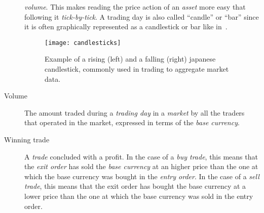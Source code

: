 \begin{description}
		\textit{volume}. This makes reading the price action of an
		\textit{asset} more easy that following it \emph{tick-by-tick}.
		A trading day is also called \enquote{candle} or \enquote{bar}
		since it is often graphically represented as a candlestick or
		bar like in~.
		\begin{figure}[b]
			\centering
			\texttt{[image: candlesticks]}
			\caption{Example of a rising (left) and a falling
				(right) japanese candlestick, commonly used in
				trading to aggregate market
				data.}\label{fig:candlesticks}
		\end{figure}
	\item[Volume] The amount traded during a \textit{trading day} in a
		\textit{market} by all the traders that operated in the market,
		expressed in terms of the \textit{base currency}.
	\item[Winning trade] A \textit{trade} concluded with a profit. In the
		case of a \textit{buy trade}, this means that the \textit{exit
		order} has sold the \textit{base currency} at an higher price
		than the one at which the base currency was bought in the
		\textit{entry order}. In the case of a \textit{sell trade}, this
		means that the exit order has bought the base currency at a
		lower price than the one at which the base currency was sold in
		the entry order.
\end{description}
